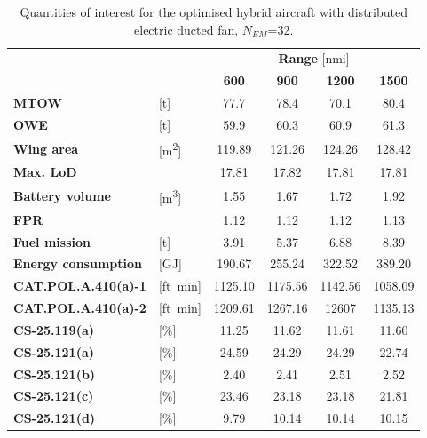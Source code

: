 \begin{table}[!h]
	\centering
	\begin{tabular}{l l c c c c}
		\cline{3-6}
		& & \multicolumn{4}{c}{\textbf{Range} [nmi]} \\
		& & \textbf{600} & \textbf{900} & \textbf{1200} & \textbf{1500} \\
		\hline
		\textbf{MTOW} & [\si{\tonne}] & 77.7 & 78.4 & 70.1 & 80.4 \\
		\textbf{OWE} & [\si{\tonne}] & 59.9 & 60.3 & 60.9 & 61.3 \\
		\textbf{Wing area} & [\si{\square\meter}] & 119.89 & 121.26 & 124.26 & 128.42  \\
		\textbf{Max. LoD} & & 17.81 & 17.82 & 17.81 & 17.81 \\
		\textbf{Battery volume} & [\si{\cubic\meter}] & 1.55 & 1.67 & 1.72 & 1.92 \\
		\textbf{FPR} & & 1.12 & 1.12 & 1.12 & 1.13 \\
		\textbf{Fuel mission} & [\si{\tonne}] & 3.91 & 5.37 & 6.88 & 8.39 \\
		\textbf{Energy consumption} & [\si{\giga\joule}] & 190.67 & 255.24 & 322.52 & 389.20 \\
		\hline
		\textbf{CAT.POL.A.410(a)-1} & [ft\si{\per\minute}] & 1125.10 & 1175.56 & 1142.56 & 1058.09 \\
		\textbf{CAT.POL.A.410(a)-2} & [ft\si{\per\minute}] & 1209.61 & 1267.16 & 12607 & 1135.13 \\
		\textbf{CS-25.119(a)} & [\%] & 11.25 & 11.62 & 11.61 & 11.60 \\
		\textbf{CS-25.121(a)} & [\%] & 24.59 & 24.29 & 24.29 & 22.74 \\
		\textbf{CS-25.121(b)} & [\%] & 2.40 & 2.41 & 2.51 & 2.52 \\
		\textbf{CS-25.121(c)} & [\%] & 23.46 & 23.18 & 23.18 & 21.81 \\
		\textbf{CS-25.121(d)} & [\%] & 9.79 & 10.14 & 10.14 & 10.15 \\
		\hline
	\end{tabular}
	\caption{Quantities of interest for the optimised hybrid aircraft with distributed electric ducted fan, $N_{EM}$=32.}
	\label{tab:hybrid_dep_optim_res_n32}
\end{table}

